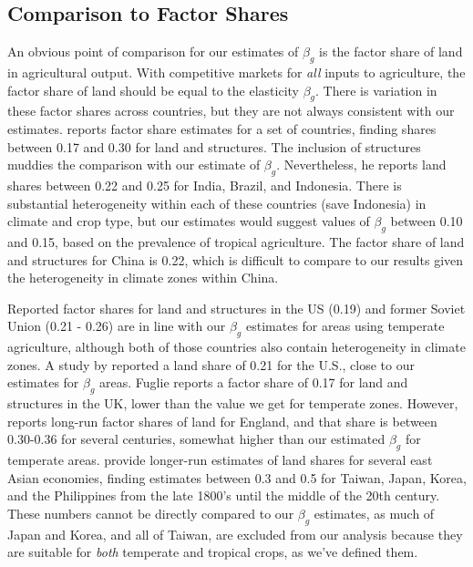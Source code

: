 \documentclass[11pt]{article}
\begin{document}
\subsection{Comparison to Factor Shares}
An obvious point of comparison for our estimates of $\beta_g$ is the factor share of land in agricultural output. With competitive markets for \textit{all} inputs to agriculture, the factor share of land should be equal to the elasticity $\beta_g$. There is variation in these factor shares across countries, but they are not always consistent with our estimates. \citet{fuglie2010} reports factor share estimates for a set of countries, finding shares between 0.17 and 0.30 for land and structures. The inclusion of structures muddies the comparison with our estimate of $\beta_g$. Nevertheless, he reports land shares between 0.22 and 0.25 for India, Brazil, and Indonesia. There is substantial heterogeneity within each of these countries (save Indonesia) in climate and crop type, but our estimates would suggest values of $\beta_g$ between 0.10 and 0.15, based on the prevalence of tropical agriculture. The factor share of land and structures for China is 0.22, which is difficult to compare to our results given the heterogeneity in climate zones within China.

Reported factor shares for land and structures in the US (0.19) and former Soviet Union (0.21 - 0.26) are in line with our $\beta_g$ estimates for areas using temperate agriculture, although both of those countries also contain heterogeneity in climate zones. A study by \citet{jg1992} reported a land share of 0.21 for the U.S., close to our estimates for $\beta_g$ areas. Fuglie reports a factor share of 0.17 for land and structures in the UK, lower than the value we get for temperate zones. However, \citet{Clark2002} reports long-run factor shares of land for England, and that share is between 0.30-0.36 for several centuries, somewhat higher than our estimated $\beta_g$ for temperate areas. \citet{hrs1979} provide longer-run estimates of land shares for several east Asian economies, finding estimates between 0.3 and 0.5 for Taiwan, Japan, Korea, and the Philippines from the late 1800's until the middle of the 20th century. These numbers cannot be directly compared to our $\beta_g$ estimates, as much of Japan and Korea, and all of Taiwan, are excluded from our analysis because they are suitable for \textit{both} temperate and tropical crops, as we've defined them. 
\end{document}
